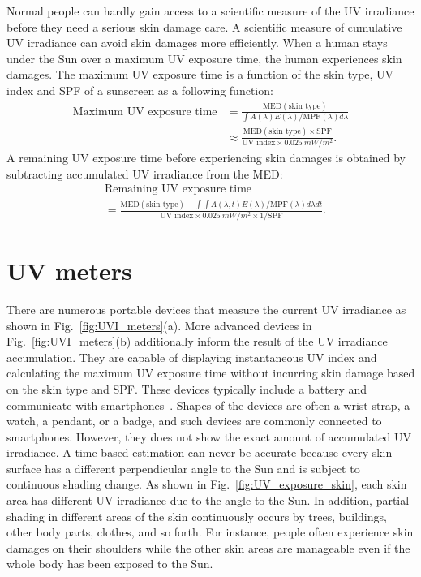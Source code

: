 \documentclass[journal]{IEEEtran}
\begin{document}
Normal people can hardly gain access to a scientific measure of the UV irradiance before they need a serious skin damage care. 
A scientific measure of cumulative UV irradiance can avoid skin damages more efficiently.
When a human stays under the Sun over a maximum UV exposure time, the human experiences skin damages. The maximum UV exposure time is a function of the skin type, UV index and SPF of a sunscreen as a following function:
%
\begin{equation} \label{eq: max_exp_time}
\begin{split}
\text{Maximum~UV~exposure~time} 
&= \frac{\text{MED}(\text{skin~type})}{\int A(\lambda)E(\lambda)  / \text{MPF}(\lambda) d \lambda} \\
&\approx \frac{\text{MED}(\text{skin~type})\times \text{SPF}}{\text{UV~index} \times 0.025~mW/m^2}.
\end{split}
\end{equation}
%
A remaining UV exposure time before experiencing skin damages is obtained by subtracting accumulated UV irradiance from the MED:
%
\begin{equation}
\begin{split}
&\text{Remaining~UV~exposure~time} \\
&= \frac{\text{MED}(\text{skin~type}) - \int \int A(\lambda, t)E(\lambda) / \text{MPF}(\lambda) d \lambda dt}{\text{UV~index} \times 0.025~mW/m^2 \times 1/\text{SPF}}.
\end{split}
\end{equation}


\section{UV meters}

There are numerous portable devices that measure the current UV irradiance as shown in Fig.~\ref{fig:UVI_meters}(a). 
More advanced devices in Fig.~\ref{fig:UVI_meters}(b) additionally inform the result of the UV irradiance accumulation. 
They are capable of displaying instantaneous UV index and calculating the maximum UV exposure time without incurring skin damage based on the skin type and SPF. 
These devices typically include a battery and communicate with smartphones~\cite{Netatmo, Ultra}. 
Shapes of the devices are often a wrist strap, a watch, a pendant, or a badge, and such devices are commonly connected to smartphones.
However, they does not show the exact amount of accumulated UV irradiance. 
A time-based estimation can never be accurate because every skin surface has a different perpendicular angle to the Sun and is subject to continuous shading change. 
%
As shown in Fig.~\ref{fig:UV_exposure_skin}, each skin area has different UV irradiance due to the angle to the Sun. 
In addition, partial shading in different areas of the skin continuously occurs by trees, buildings, other body parts, clothes, and so forth. 
For instance, people often experience skin damages on their shoulders while the other skin areas are manageable even if the whole body has been exposed to the Sun.
\end{document}
